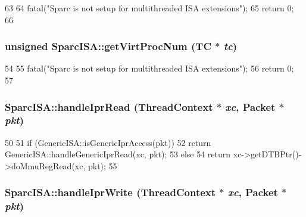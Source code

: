 \begin{DoxyCode}
63 {
64     fatal("Sparc is not setup for multithreaded ISA extensions");
65     return 0;
66 }
\end{DoxyCode}
\hypertarget{namespaceSparcISA_a94f35932feb0cb5ef4428bf4572343e3}{
\subsubsection[{getVirtProcNum}]{\setlength{\rightskip}{0pt plus 5cm}unsigned SparcISA::getVirtProcNum (TC $\ast$ {\em tc})}}
\label{namespaceSparcISA_a94f35932feb0cb5ef4428bf4572343e3}



\begin{DoxyCode}
54 {
55     fatal("Sparc is not setup for multithreaded ISA extensions");
56     return 0;
57 }
\end{DoxyCode}
\hypertarget{namespaceSparcISA_a7ffad0153adc8a171207f50d0fe42349}{
\subsubsection[{handleIprRead}]{ SparcISA::handleIprRead ({\bf ThreadContext} $\ast$ {\em xc}, \/  {\bf Packet} $\ast$ {\em pkt})}}
\label{namespaceSparcISA_a7ffad0153adc8a171207f50d0fe42349}



\begin{DoxyCode}
50 {
51     if (GenericISA::isGenericIprAccess(pkt))
52         return GenericISA::handleGenericIprRead(xc, pkt);
53     else
54         return xc->getDTBPtr()->doMmuRegRead(xc, pkt);
55 }
\end{DoxyCode}
\hypertarget{namespaceSparcISA_a57a617c69d03da2039f82d07f711e03e}{
\subsubsection[{handleIprWrite}]{ SparcISA::handleIprWrite ({\bf ThreadContext} $\ast$ {\em xc}, \/  {\bf Packet} $\ast$ {\em pkt})}}
\label{namespaceSparcISA_a57a617c69d03da2039f82d07f711e03e}



